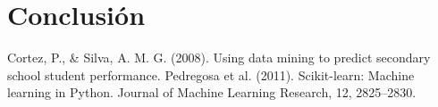 \documentclass[10pt, conference]{IEEEtran}
\begin{document}
\section{Conclusión}


\begin{thebibliography}{9}
 Cortez, P., \& Silva, A. M. G. (2008). Using data mining to predict secondary school student performance.
 Pedregosa et al. (2011). Scikit-learn: Machine learning in Python. Journal of Machine Learning Research, 12, 2825–2830.
\end{thebibliography}
\end{document}
